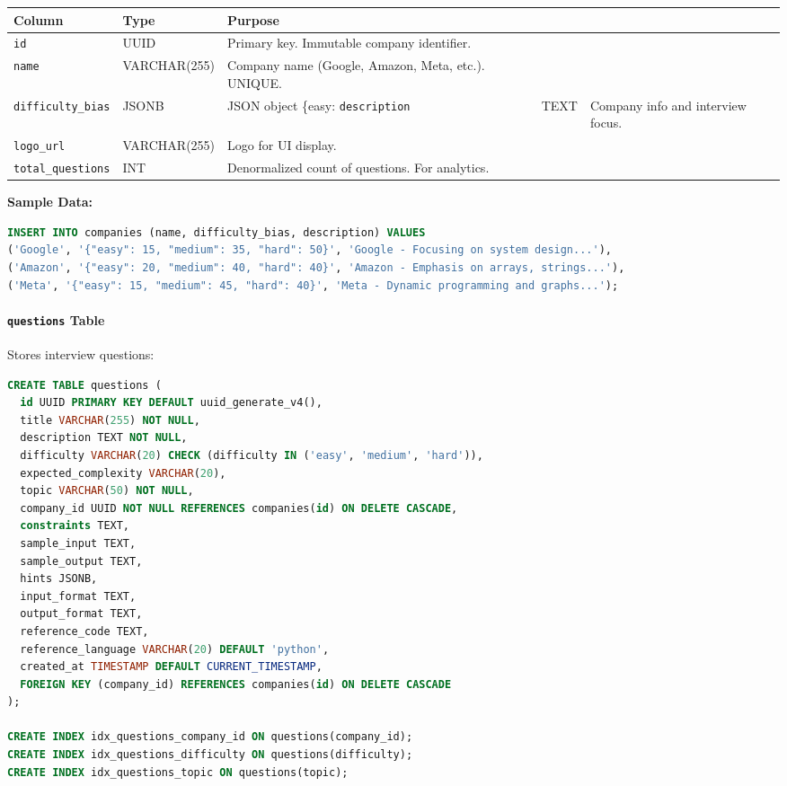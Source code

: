 \documentclass[12pt,a4paper,oneside]{article}
\newcommand{\varname}[1]{\texttt{#1}}
\newcommand{\database}[1]{\texttt{#1}}
\begin{document}
\begin{table}[H]
\centering
\begin{tabular}{|p{2.5cm}|p{2cm}|p{9cm}|}
\hline
\textbf{Column} & \textbf{Type} & \textbf{Purpose} \\
\hline
\varname{id} & UUID & Primary key. Immutable company identifier. \\
\hline
\varname{name} & VARCHAR(255) & Company name (Google, Amazon, Meta, etc.). UNIQUE. \\
\hline
\varname{difficulty\_bias} & JSONB & JSON object \{easy: %
\hline
\varname{description} & TEXT & Company info and interview focus. \\
\hline
\varname{logo\_url} & VARCHAR(255) & Logo for UI display. \\
\hline
\varname{total\_questions} & INT & Denormalized count of questions. For analytics. \\
\hline
\end{tabular}
\end{table}

\textbf{Sample Data:}

\begin{lstlisting}[language=SQL]
INSERT INTO companies (name, difficulty_bias, description) VALUES
('Google', '{"easy": 15, "medium": 35, "hard": 50}', 'Google - Focusing on system design...'),
('Amazon', '{"easy": 20, "medium": 40, "hard": 40}', 'Amazon - Emphasis on arrays, strings...'),
('Meta', '{"easy": 15, "medium": 45, "hard": 40}', 'Meta - Dynamic programming and graphs...');
\end{lstlisting}

\paragraph{\database{questions} Table}

Stores interview questions:

\begin{lstlisting}[language=SQL, caption=Questions Table Schema]
CREATE TABLE questions (
  id UUID PRIMARY KEY DEFAULT uuid_generate_v4(),
  title VARCHAR(255) NOT NULL,
  description TEXT NOT NULL,
  difficulty VARCHAR(20) CHECK (difficulty IN ('easy', 'medium', 'hard')),
  expected_complexity VARCHAR(20),
  topic VARCHAR(50) NOT NULL,
  company_id UUID NOT NULL REFERENCES companies(id) ON DELETE CASCADE,
  constraints TEXT,
  sample_input TEXT,
  sample_output TEXT,
  hints JSONB,
  input_format TEXT,
  output_format TEXT,
  reference_code TEXT,
  reference_language VARCHAR(20) DEFAULT 'python',
  created_at TIMESTAMP DEFAULT CURRENT_TIMESTAMP,
  FOREIGN KEY (company_id) REFERENCES companies(id) ON DELETE CASCADE
);

CREATE INDEX idx_questions_company_id ON questions(company_id);
CREATE INDEX idx_questions_difficulty ON questions(difficulty);
CREATE INDEX idx_questions_topic ON questions(topic);
\end{lstlisting}
\end{document}
